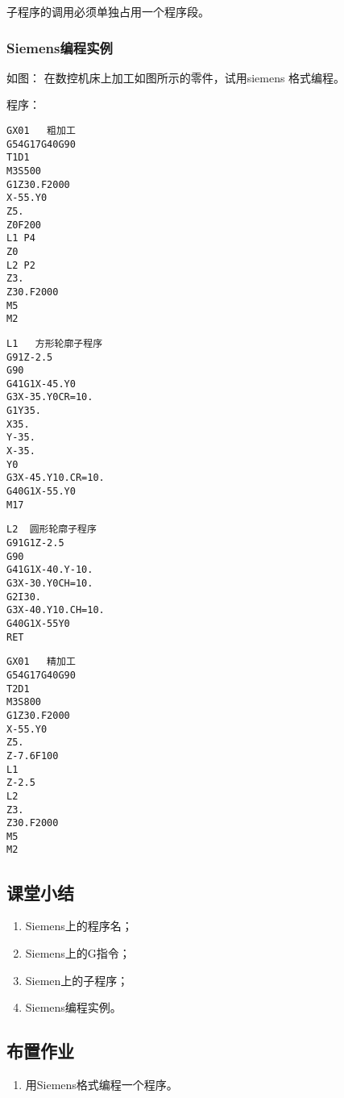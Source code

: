 子程序的调用必须单独占用一个程序段。

\subsubsection{Siemens编程实例}
如图： 在数控机床上加工如图所示的零件，试用siemens
格式编程。

程序：
\begin{lstlisting}
GX01   粗加工
G54G17G40G90
T1D1
M3S500
G1Z30.F2000
X-55.Y0
Z5.
Z0F200
L1 P4
Z0
L2 P2
Z3.
Z30.F2000
M5
M2	
\end{lstlisting}

\begin{lstlisting}
L1   方形轮廓子程序
G91Z-2.5
G90
G41G1X-45.Y0
G3X-35.Y0CR=10.
G1Y35.
X35.
Y-35.
X-35.
Y0
G3X-45.Y10.CR=10.
G40G1X-55.Y0
M17
\end{lstlisting}

\begin{lstlisting}
L2  圆形轮廓子程序
G91G1Z-2.5
G90
G41G1X-40.Y-10.
G3X-30.Y0CH=10.
G2I30.
G3X-40.Y10.CH=10.
G40G1X-55Y0
RET
\end{lstlisting}

\begin{lstlisting}
GX01   精加工
G54G17G40G90
T2D1
M3S800
G1Z30.F2000
X-55.Y0
Z5.
Z-7.6F100  
L1 
Z-2.5
L2 
Z3.
Z30.F2000
M5
M2
\end{lstlisting}

\subsection{课堂小结}
\begin{enumerate}[1、]
	\item Siemens上的程序名；
	\item Siemens上的G指令；
	\item Siemen上的子程序；
	\item Siemens编程实例。
\end{enumerate}

\vfill
\subsection{布置作业}
\begin{enumerate}[1、]
	\item 用Siemens格式编程一个程序。
\end{enumerate}
\vfill